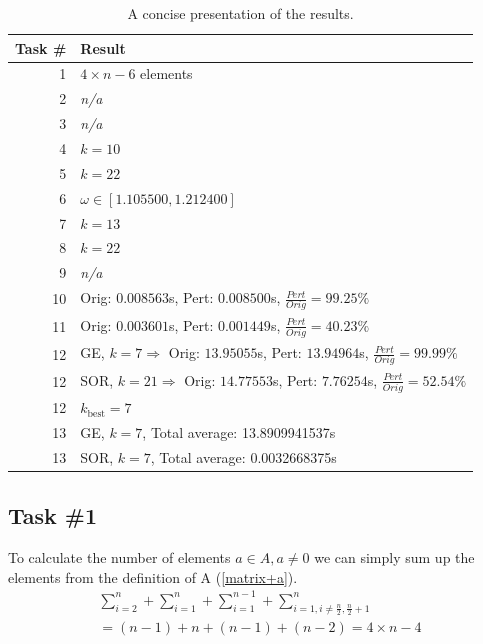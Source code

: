 \documentclass[10pt, a4paper]{article}
\begin{document}
\begin{table}[h]
\begin{center}
\begin{tabular}{r | l}
Task \# & Result \\ \hline
1		& $4\times n-6$ elements                                                     			\\
2		& \emph{n/a}                                                                 			\\
3		& \emph{n/a}                                                                 			\\
4		& $k=10$                                                                     			\\
5		& $k=22$	                                                             			\\
6		& $\omega\in[1.105500, 1.212400]$                                            			\\
7		& $k=13$                                                                     			\\
8		& $k=22$                                                                     			\\
9		& \emph{n/a}                                                                 			\\
10		& Orig: $0.008563$s, Pert: $0.008500$s, $\frac{Pert}{Orig}=99.25\%$ 	     			\\
11		& Orig: $0.003601$s, Pert: $0.001449$s, $\frac{Pert}{Orig}=40.23\%$ 	     			\\
12		& GE, $k=7 \Rightarrow$ Orig: $13.95055$s, Pert: $13.94964$s, $\frac{Pert}{Orig}=99.99\%$	\\
12		& SOR, $k=21 \Rightarrow$ Orig: $14.77553$s, Pert: $7.76254$s, $\frac{Pert}{Orig}=52.54\%$	\\
12		& $k_\mathrm{best}=7$ 										\\
13		& GE, $k=7$, Total average: 13.8909941537s							\\
13		& SOR, $k=7$,  Total average: 0.0032668375s
\end{tabular}
\caption{A concise presentation of the results.}
\end{center}
\label{table+result}
\end{table}

\subsection{Task \#1}
To calculate the number of elements $a\in A, a\neq0$ we can simply sum up the elements from the definition of A (\ref{matrix+a}).
\begin{eqnarray}
		\sum_{i=2}^n + \sum_{i=1}^n+\sum_{i=1}^{n-1}+\sum_{i=1,i\neq \frac{n}{2},\frac{n}{2}+1}^n \\
		= (n-1)+n+(n-1)+(n-2)=4\times n -4
\end{eqnarray}
\end{document}
